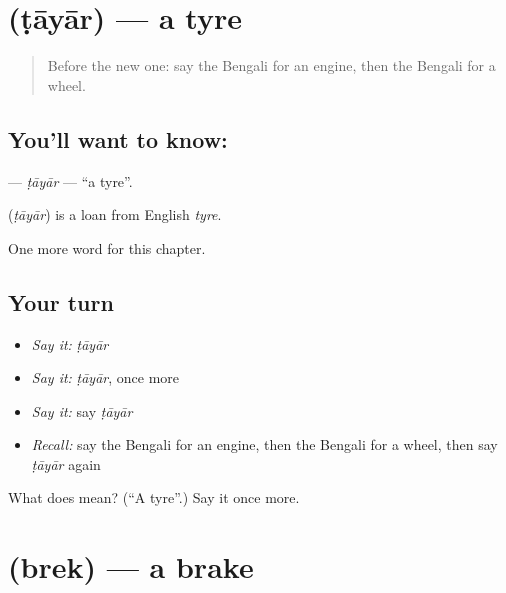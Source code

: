 \section[\texorpdfstring{\bn{টায়ার} (ṭāyār)}{টায়ার (ṭāyār)}]{ (ṭāyār) — a tyre}

\label{lesson:BN-C174-tayar}



\begin{quote}
Before the new one: say the Bengali for an engine, then the Bengali for a wheel.
\end{quote}

\subsection*{You'll want to know: }
\textbf{} — \emph{ṭāyār} — \textquotedblleft{}a tyre\textquotedblright{}.

\begin{cousinweb}
\textbf{} (\emph{ṭāyār}) is a loan from English \emph{tyre}.
\end{cousinweb}

\begin{grammarlens}[title={What you've built}]
One more word for this chapter.
\end{grammarlens}

\subsection*{Your turn}
\begin{itemize}
\raggedright
  \item \emph{Say it:} \emph{ṭāyār}
  \item \emph{Say it:} \emph{ṭāyār}, once more
  \item \emph{Say it:} say \emph{ṭāyār}
  \item \emph{Recall:} say the Bengali for an engine, then the Bengali for a wheel, then say \emph{ṭāyār} again
\end{itemize}

\begin{tcolorbox}[breakable,colback=teal!4,colframe=teal!35!black,title={Before you move on}]
What does  mean? (\textquotedblleft{}A tyre\textquotedblright{}.) Say it once more.
\end{tcolorbox}
\section[\texorpdfstring{\bn{ব্রেক} (brek)}{ব্রেক (brek)}]{ (brek) — a brake}

